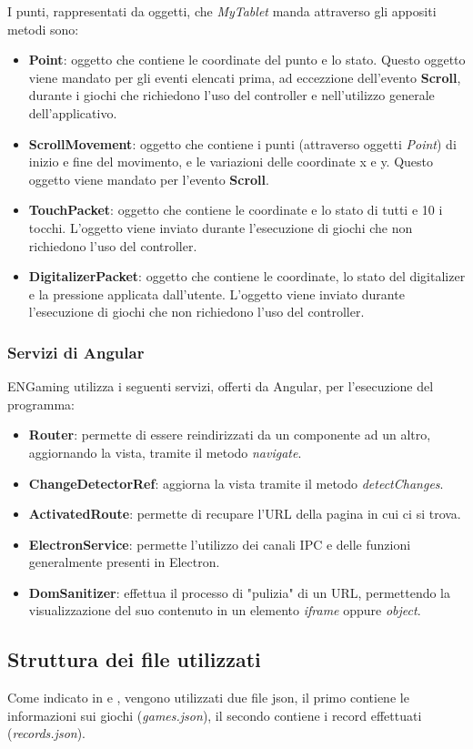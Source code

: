 I punti, rappresentati da oggetti, che \emph{MyTablet} manda attraverso gli appositi metodi sono:
\begin{itemize}
    \item \textbf{Point}: oggetto che contiene le coordinate del punto e lo stato. Questo oggetto viene mandato per gli eventi elencati prima, ad eccezzione dell'evento \textbf{Scroll}, durante i giochi che richiedono l'uso del controller e nell'utilizzo generale dell'applicativo.
    \item \textbf{ScrollMovement}: oggetto che contiene i punti (attraverso oggetti \emph{Point}) di inizio e fine del movimento, e le variazioni delle coordinate x e y. Questo oggetto viene mandato per l'evento \textbf{Scroll}.
    \item \textbf{TouchPacket}: oggetto che contiene le coordinate e lo stato di tutti e 10 i tocchi. L'oggetto viene inviato durante l'esecuzione di giochi che non richiedono l'uso del controller.
    \item \textbf{DigitalizerPacket}: oggetto che contiene le coordinate, lo stato del digitalizer e la pressione applicata dall'utente. L'oggetto viene inviato durante l'esecuzione di giochi che non richiedono l'uso del controller.
\end{itemize}
\subsubsection{Servizi di Angular}
\label{subsec:angularServices}
ENGaming utilizza i seguenti servizi, offerti da Angular, per l'esecuzione del programma:
\begin{itemize}
    \item \textbf{Router}: permette di essere reindirizzati da un componente ad un altro, aggiornando la vista, tramite il metodo \emph{navigate}.
    \item \textbf{ChangeDetectorRef}: aggiorna la vista tramite il metodo \emph{detectChanges}.
    \item \textbf{ActivatedRoute}: permette di recupare l'URL della pagina in cui ci si trova.
    \item \textbf{ElectronService}: permette l'utilizzo dei canali IPC e delle funzioni generalmente presenti in Electron.
    \item \textbf{DomSanitizer}: effettua il processo di "pulizia" di un URL, permettendo la visualizzazione del suo contenuto in un elemento \emph{iframe} oppure \emph{object}.
\end{itemize}
\subsection{Struttura dei file utilizzati}
\label{subsec:strutturaFile}
Come indicato in  e , vengono utilizzati due file json, il primo contiene le informazioni sui giochi (\emph{games.json}), il secondo contiene i record effettuati (\emph{records.json}).
